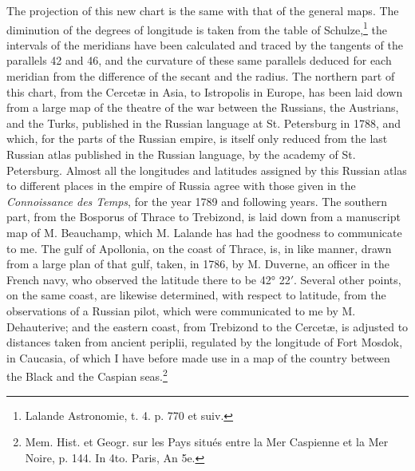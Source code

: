 \documentclass[a4paper, 11pt, oneside, polutonikogreek, english]{article}
\begin{document}
The projection of this new chart is the same with that of the general maps. The diminution of the degrees of longitude is taken from the table of Schulze,\footnote{Lalande Astronomie, t. 4. p. 770 et suiv.} the intervals of the meridians have been calculated and traced by the tangents of the parallels 42 and 46, and the curvature of these same parallels deduced for each meridian from the difference of the secant and the radius. The northern part of this chart, from the Cercetæ in Asia, to Istropolis in Europe, has been laid down from a large map of the theatre of the war between the Russians, the Austrians, and the Turks, published in the Russian language at St. Petersburg in 1788, and which, for the parts of the Russian empire, is itself only reduced from the last Russian atlas published in the Russian language, by the academy of St. Petersburg. Almost all the longitudes and latitudes assigned by this Russian atlas to different places in the empire of Russia agree with those given in the \emph{Connoissance des Temps}, for the year 1789 and following years. The southern part, from the Bosporus of Thrace to Trebizond, is laid down from a manuscript map of M. Beauchamp, which M. Lalande has had the goodness to communicate to me. The gulf of Apollonia, on the coast of Thrace, is, in like manner, drawn from a large plan of that gulf, taken, in 1786, by M. Duverne, an officer in the French navy, who observed the latitude there to be 42° 22$'$. Several other points, on the same coast, are likewise determined, with respect to latitude, from the observations of a Russian pilot, which were communicated to me by M. Dehauterive; and the eastern coast, from Trebizond to the Cercetæ, is adjusted to distances taken from ancient periplii, regulated by the longitude of Fort Mosdok, in Caucasia, of which I have before made use in a map of the country between the Black and the Caspian seas.\footnote{Mem. Hist. et Geogr. sur les Pays situés entre la Mer Caspienne et la Mer Noire, p. 144. In 4to. Paris, An 5e.}
\end{document}
